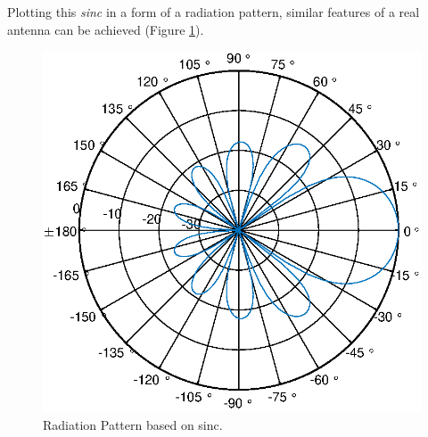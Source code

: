 Plotting this \textit{sinc} in a form of a radiation pattern, similar features of a real antenna can be achieved (Figure \ref{fig:radiationpattern}).

\begin{figure}[H]
	\centering
	\includegraphics[scale=1.1]{figures/RadPattern.eps}
	\caption{Radiation Pattern based on sinc.}
	\label{fig:radiationpattern}
\end{figure}
